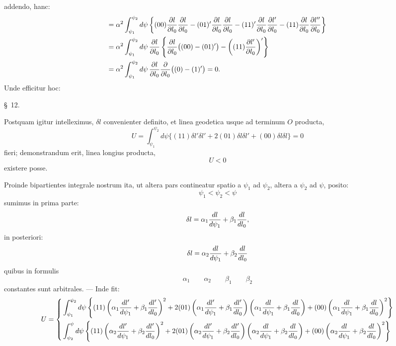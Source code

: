 addendo, hanc:
\[
\begin{aligned}
={}&\alpha^2\int_{\psi_1}^{\psi_2}d\psi\left\{(00){\partial l\over \partial l_0}{\partial l\over \partial l_0}
-(01)'{\partial l\over \partial l_0}{\partial l\over \partial l_0}
-(11)'{\partial l\over \partial l_0}{\partial l'\over \partial l_0}
-(11){\partial l\over \partial l_0}{\partial l''\over \partial l_0}\right\}\\
={}&\alpha^2\int_{\psi_1}^{\psi_2}d\psi\,{\partial l\over \partial l_0}
\left\{{\partial l\over \partial l_0}\bigl((00)-(01)'\bigr)-\left((11){\partial l'\over \partial l_0}\right)'\right\}\\
={}&\alpha^2\int_{\psi_1}^{\psi_2}d\psi\,{\partial l\over \partial l_0}{\partial\over \partial l_0}\bigl((0)-(1)'\bigr)=0.
\end{aligned}
\]
Unde efficitur hoc:
\begin{quote}
\end{quote}

\begin{center}\S\ 12.\end{center}

Postquam igitur intelleximus, $\delta l$ convenienter definito, et linea geodetica usque ad terminum $O$ producta,
\[
 U=\int_{\psi_1}^{\psi_2}d\psi\{(11)\delta l'\delta l'+2(01)\delta l\delta l'+(00)\delta l\delta l\}=0
\]
fieri; demonstrandum erit, linea longius producta,
\[
 U<0
\]
existere posse.

Proinde bipartientes integrale nostrum ita, ut altera pars contineatur spatio a $\psi_1$ ad $\psi_2$, altera a $\psi_2$ ad $\psi$, posito:
\[
 \psi_1<\psi_2<\psi
\]
sumimus in prima parte:
\[
 \delta l=\alpha_1{dl\over d\psi_1}+\beta_1{dl\over dl_0},
\]
in posteriori:
\[
 \delta l=\alpha_2{dl\over d\psi_1}+\beta_2{dl\over dl_0}
\]
quibus in formulis
\[
 \alpha_1\qquad \alpha_2\qquad \beta_1\qquad \beta_2
\]
constantes sunt arbitrales. --- Inde fit:
\begingroup\tiny
\[
\begin{aligned}
U=\left\{\begin{aligned}
&\int_{\psi_1}^{\psi_2}d\psi\left\{(11)\left(\alpha_1{dl'\over d\psi_1}+\beta_1{dl'\over dl_0}\right)^2
+2(01)\left(\alpha_1{dl'\over d\psi_1}+\beta_1{dl'\over dl_0}\right)\left(\alpha_1{dl\over d\psi_1}+\beta_1{dl\over dl_0}\right)
+(00)\left(\alpha_1{dl\over d\psi_1}+\beta_1{dl\over dl_0}\right)^2\right\}\\
&\int_{\psi_2}^{\psi}d\psi\left\{(11)\left(\alpha_2{dl'\over d\psi_1}+\beta_2{dl'\over dl_0}\right)^2
+2(01)\left(\alpha_2{dl'\over d\psi_1}+\beta_2{dl'\over dl_0}\right)\left(\alpha_2{dl\over d\psi_1}+\beta_2{dl\over dl_0}\right)
+(00)\left(\alpha_2{dl\over d\psi_1}+\beta_2{dl\over dl_0}\right)^2\right\}
\end{aligned}\right.
\end{aligned}
\]
\endgroup
